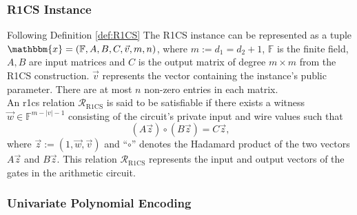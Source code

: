 \subsubsection{R1CS Instance}%
\sloppy Following Definition \ref{def:R1CS} The R1CS instance can be represented as a tuple $\mathbbm{x} = (\mathbb{F},A,B,C,\vec{v},m,n)$, where $m:=d_1=d_2+1$, $\mathbb{F}$ is the finite field, $A,B$ are input matrices and $C$ is the output matrix of degree $m \times m$ from the R1CS construction. $\vec{v}$ represents the vector containing the instance's public parameter. There are at most $n$ non-zero entries in each matrix. \\

An \gls{r1cs} relation $\mathcal{R}_{\mathrm{R1CS}}$ is said to be satisfiable if there exists a witness $\vec{w} \in \mathbb{F}^{m - |v| - 1}$ consisting of the circuit's private input and wire values such that
\begin{equation*}
	(A\vec{z}) \circ (B\vec{z}) = C\vec{z},
\end{equation*}
where $\vec{z} := (1,\vec{w}, \vec{v})$ and “$\circ$” denotes the Hadamard product of the two vectors $A\vec{z}$ and $B\vec{z}$. This relation $\mathcal{R}_{\mathrm{R1CS}}$ represents the input and output vectors of the gates in the arithmetic circuit. \\



\subsubsection{Univariate Polynomial Encoding}\label{univariate_pol}

